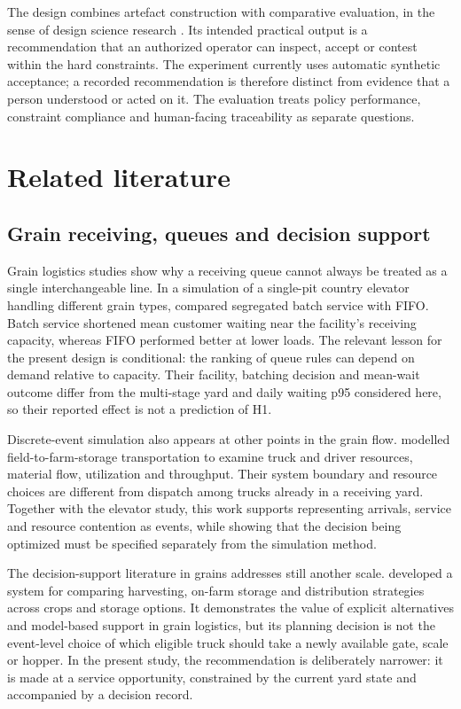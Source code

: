 \documentclass[12pt,a4paper]{article}
\begin{document}
The design combines artefact construction with comparative evaluation, in the sense of design science research \parencite{peffersDesignScienceResearch2007aa}. Its intended practical output is a recommendation that an authorized operator can inspect, accept or contest within the hard constraints. The experiment currently uses automatic synthetic acceptance; a recorded recommendation is therefore distinct from evidence that a person understood or acted on it. The evaluation treats policy performance, constraint compliance and human-facing traceability as separate questions.

\section{Related literature}

\subsection{Grain receiving, queues and decision support}

Grain logistics studies show why a receiving queue cannot always be treated as a single interchangeable line. In a simulation of a single-pit country elevator handling different grain types, \textcite{r.berrutoAnalyzingReceivingOperation2001a} compared segregated batch service with FIFO. Batch service shortened mean customer waiting near the facility's receiving capacity, whereas FIFO performed better at lower loads. The relevant lesson for the present design is conditional: the ranking of queue rules can depend on demand relative to capacity. Their facility, batching decision and mean-wait outcome differ from the multi-stage yard and daily waiting p95 considered here, so their reported effect is not a prediction of H1.

Discrete-event simulation also appears at other points in the grain flow. \textcite{turnerDiscreteEventSimulation2019a} modelled field-to-farm-storage transportation to examine truck and driver resources, material flow, utilization and throughput. Their system boundary and resource choices are different from dispatch among trucks already in a receiving yard. Together with the elevator study, this work supports representing arrivals, service and resource contention as events, while showing that the decision being optimized must be specified separately from the simulation method.

The decision-support literature in grains addresses still another scale. \textcite{mardanehDecisionSupportSystem2021a} developed a system for comparing harvesting, on-farm storage and distribution strategies across crops and storage options. It demonstrates the value of explicit alternatives and model-based support in grain logistics, but its planning decision is not the event-level choice of which eligible truck should take a newly available gate, scale or hopper. In the present study, the recommendation is deliberately narrower: it is made at a service opportunity, constrained by the current yard state and accompanied by a decision record.
\end{document}
